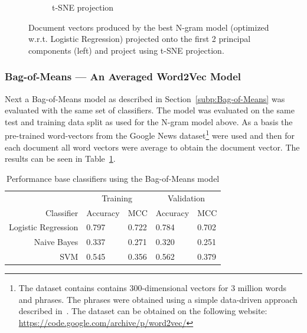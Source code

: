 \begin{figure}[h]
\begin{subfigure}[b]{0.48\textwidth}
      \caption{t-SNE projection}
\label{fig:ngram-tsne}
    \end{subfigure}
    \caption{Document vectors produced by the best N-gram model (optimized w.r.t. Logistic Regression) projected onto the first 2 principal components (left) and project using t-SNE projection.}
\label{fig:ngram}
\end{figure}

\subsubsection{Bag-of-Means --- An Averaged Word2Vec Model}

Next a Bag-of-Means model as described in Section~\ref{subp:Bag-of-Means} was evaluated with the same set of classifiers. The model was evaluated on the same test and training data split as used for the N-gram model above. As a basis the pre-trained word-vectors from the Google News dataset\footnote{The dataset contains contains 300-dimensional vectors for 3 million words and phrases. The phrases were obtained using a simple data-driven approach described in~\cite{Mikolov:2013ab}. The dataset can be obtained on the following website: \url{https://code.google.com/archive/p/word2vec/}} were used and then for each document all word vectors were average to obtain the document vector. The results can be seen in Table~\ref{tab:Bag-Of-Means Results}.

\begin{table}[h]
  \begin{center}
  \begin{tabular}{ r | *2l | *2l }
    \toprule
     & \multicolumn{2}{c|}{Training} & \multicolumn{2}{|c}{Validation}\\
    Classifier & Accuracy & MCC & Accuracy & MCC \\
    \midrule
    Logistic Regression & 0.797 & 0.722 & 0.784 & 0.702 \\
    Naive Bayes         & 0.337 & 0.271 & 0.320 & 0.251 \\
    SVM                 & 0.545 & 0.356 & 0.562 & 0.379 \\
    \bottomrule
  \end{tabular}
  \caption{Performance base classifiers using the Bag-of-Means model}
\label{tab:Bag-Of-Means Results}
\end{center}
\end{table}

